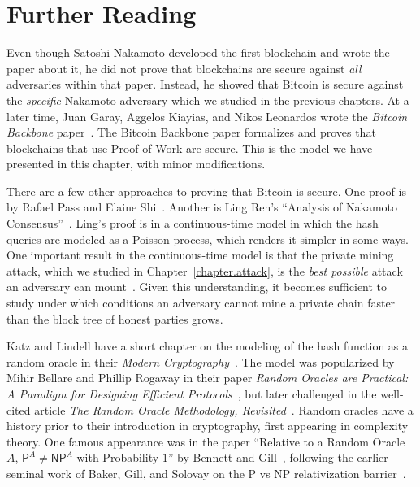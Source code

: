 \section{Further Reading}
Even though Satoshi Nakamoto developed the first blockchain and wrote the paper about it, he did
not prove that blockchains are secure against \emph{all} adversaries within that paper. Instead,
he showed that Bitcoin is secure against the \emph{specific} Nakamoto adversary which we studied
in the previous chapters. At a later time, Juan Garay, Aggelos Kiayias, and Nikos Leonardos
wrote the \emph{Bitcoin Backbone} paper~\cite{backbone}.
The Bitcoin Backbone paper formalizes and proves that blockchains that use Proof-of-Work
are secure. This is the model we have presented in this chapter, with minor modifications.

There are a few other approaches to proving that Bitcoin is secure. One proof is by
Rafael Pass and Elaine Shi~\cite{rethinking-consensus}. Another is Ling Ren's
``Analysis of Nakamoto Consensus''~\cite{ling-analysis}. Ling's proof is in a continuous-time
model in which the hash queries are modeled as a Poisson process, which renders it simpler
in some ways. One important result in the continuous-time model is that the private mining
attack, which we studied in Chapter~\ref{chapter.attack}, is the \emph{best possible} attack
an adversary can mount~\cite{nakamoto-wins}. Given this understanding, it becomes sufficient
to study under which conditions an adversary cannot mine a private chain faster than the block tree of
honest parties grows.

Katz and Lindell have a short chapter on the modeling of the hash function as a random oracle
in their \emph{Modern Cryptography}~\cite{katz}. The model was popularized by Mihir Bellare
and Phillip Rogaway in their paper \emph{Random Oracles are Practical: A Paradigm for Designing
Efficient Protocols}~\cite{ro}, but later challenged in the well-cited article \emph{The Random
Oracle Methodology, Revisited}~\cite{ro-revisited}. Random oracles have a history prior to their introduction in
cryptography, first appearing in complexity theory. One famous appearance was in
the paper ``Relative to a Random Oracle $A$, $\textsf{P}^A \neq \textsf{NP}^A$
with Probability $1$'' by Bennett and Gill~\cite{p-vs-np-randomoracle}, following the earlier seminal
work of Baker, Gill, and Solovay on the \textsf{P} vs \textsf{NP} relativization
barrier~\cite{relativization-barrier}.